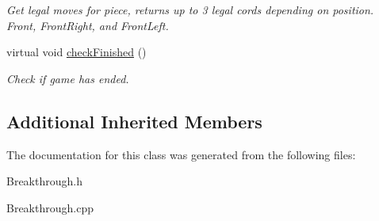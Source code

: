 \begin{DoxyCompactItemize}
\begin{DoxyCompactList}\small\item\em Get legal moves for piece, returns up to 3 legal cords depending on position. Front, Front\-Right, and Front\-Left. \end{DoxyCompactList}\item 
\hypertarget{class_breaktrough_ae9e5edbac2c2fcce47711697eb3a8a2d}{virtual void \hyperlink{class_breaktrough_ae9e5edbac2c2fcce47711697eb3a8a2d}{check\-Finished} ()}\label{class_breaktrough_ae9e5edbac2c2fcce47711697eb3a8a2d}

\begin{DoxyCompactList}\small\item\em Check if game has ended. \end{DoxyCompactList}\end{DoxyCompactItemize}
\subsection*{Additional Inherited Members}


The documentation for this class was generated from the following files\-:\begin{DoxyCompactItemize}
\item 
Breakthrough.\-h\item 
Breakthrough.\-cpp\end{DoxyCompactItemize}
